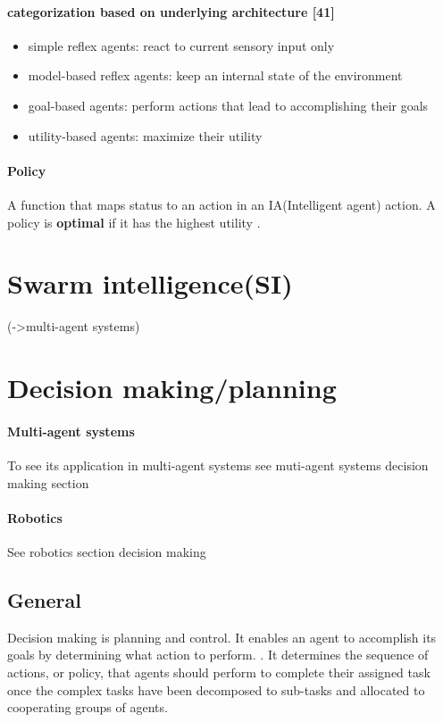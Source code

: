 \documentclass{article}
\begin{document}
	  \paragraph{categorization based on underlying architecture \citet{rizk-2018-decision-making-in-multiagent-systems-a-survey} [41]}
		 \begin{itemize}
		 	\item simple reflex agents:  react to current sensory input only 
		 	\item model-based reflex agents: keep an internal state of the environment
		 	\item goal-based agents:  perform actions that lead to accomplishing their goals
		 	\item utility-based agents:  maximize their utility
		 \end{itemize}
	 
	 \paragraph{Policy} A function that maps status to an action in an IA(Intelligent agent) action.  A policy is \textbf{optimal} if it has the highest utility \citep{rizk-2018-decision-making-in-multiagent-systems-a-survey}. 
	 
	 \section{Swarm intelligence(SI)} 
	  (->multi-agent systems)
	 
	 \section{Decision making/planning}
	 	\paragraph{Multi-agent systems} To see its application in multi-agent systems see muti-agent systems decision making section
	 	\paragraph{Robotics} See robotics section decision making
	 	
	 	\subsection{General}
	 	Decision making is planning and control. It enables an agent to accomplish its goals by determining what action to perform. \cite{rizk-2018-decision-making-in-multiagent-systems-a-survey}.
	 	It determines the sequence of actions, or policy, that agents should perform to complete their assigned task once the complex tasks have been decomposed to sub-tasks and allocated to cooperating groups of agents. 
	 	
\end{document}
